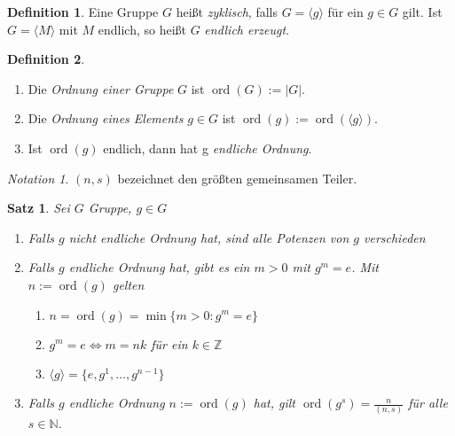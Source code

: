 \documentclass[12pt]{scrartcl} %
\DeclareMathOperator{\ord}{ord}
\newtheorem{thm}{Satz}
\theoremstyle{definition}
\newtheorem*{defn}{Definition}
\theoremstyle{remark}
\newtheorem*{notation}{Notation}
\begin{document}
\begin{defn}
	Eine Gruppe $G$ heißt \emph{zyklisch}, falls $G = \langle g \rangle$ für ein $g \in G$ gilt. \newline
	Ist $G = \langle M \rangle$ mit $M$ endlich, so heißt $G$ \emph{endlich erzeugt}.
\end{defn}

\begin{defn}
	\begin{enumerate}[label=(\roman*)]
	\item Die \emph{Ordnung einer Gruppe} $G$ ist $\ord(G):=\vert G \vert$.
	\item Die \emph{Ordnung eines Elements} $g \in G$ ist $\ord(g):=\ord(\langle g \rangle)$.
	\item Ist $\ord(g)$ endlich, dann hat g \emph{endliche Ordnung}.
	\end{enumerate}
\end{defn}

\begin{notation}
	$(n,s)$ bezeichnet den größten gemeinsamen Teiler.
\end{notation}

\begin{thm}
	Sei $G$ Gruppe, $g \in G$
	\begin{enumerate}
	\item Falls \(g\) nicht endliche Ordnung hat, sind alle Potenzen von \(g\) verschieden
	\item Falls \(g\) endliche Ordnung hat, gibt es ein \(m > 0\) mit \(g^m = e\).
		Mit \(n := \ord(g)\) gelten
		\begin{enumerate}[label=(\alph*)]
		\item $n = \ord(g) = \min \lbrace m>0 : g^{m}=e \rbrace$
		\item $g^{m}=e \Longleftrightarrow m=nk$ für ein $k \in \mathbb{Z}$
		\item $\langle g \rangle = \lbrace e, g^{1},\dots,g^{n-1}\rbrace$
		\end{enumerate}
	\item Falls \(g\) endliche Ordnung $n := \ord(g)$ hat, gilt $\ord(g^{s}) = \frac{n}{(n,s)}$ für alle \(s \in \mathbb N\).
	\end{enumerate}
\end{thm}
\end{document}
